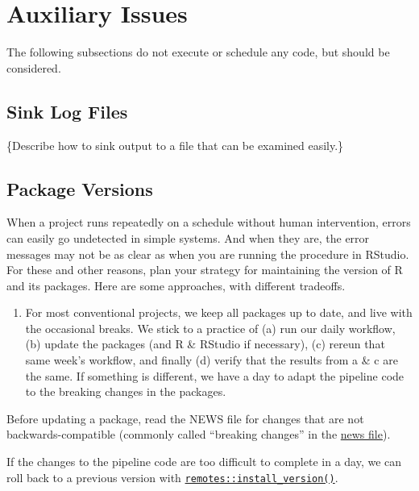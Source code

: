 \documentclass[
]{book}
\providecommand{\tightlist}{%
  \setlength{\itemsep}{0pt}\setlength{\parskip}{0pt}}
\begin{document}
\hypertarget{auxiliary-issues}{%
\section{Auxiliary Issues}\label{auxiliary-issues}}

The following subsections do not execute or schedule any code, but should be considered.

\hypertarget{sink-log-files}{%
\subsection{Sink Log Files}\label{sink-log-files}}

\{Describe how to sink output to a file that can be examined easily.\}

\hypertarget{package-versions}{%
\subsection{Package Versions}\label{package-versions}}

When a project runs repeatedly on a schedule without human intervention, errors can easily go undetected in simple systems. And when they are, the error messages may not be as clear as when you are running the procedure in RStudio. For these and other reasons, plan your strategy for maintaining the version of R and its packages. Here are some approaches, with different tradeoffs.

\begin{enumerate}
\def\labelenumi{\arabic{enumi}.}
\tightlist
\item
  For most conventional projects, we keep all packages up to date, and live with the occasional breaks. We stick to a practice of (a) run our daily workflow, (b) update the packages (and R \& RStudio if necessary), (c) rereun that same week's workflow, and finally (d) verify that the results from a \& c are the same. If something is different, we have a day to adapt the pipeline code to the breaking changes in the packages.
\end{enumerate}

Before updating a package, read the NEWS file for changes that are not backwards-compatible (commonly called ``breaking changes'' in the \href{https://style.tidyverse.org/news.html\#breaking-changes}{news file}).

If the changes to the pipeline code are too difficult to complete in a day, we can roll back to a previous version with \href{https://remotes.r-lib.org/reference/install_version.html}{\texttt{remotes::install\_version()}}.
\end{document}
